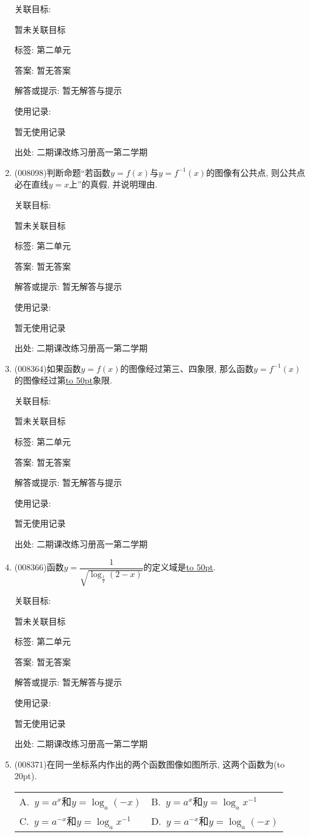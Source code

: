 \documentclass[10pt,a4paper]{article}
\newcommand{\blank}[1]{\underline{\hbox to #1pt{}}}
\newcommand{\bracket}[1]{(\hbox to #1pt{})}
\newcommand{\twoch}[4]{\par\begin{tabular}{p{.46\textwidth}p{.46\textwidth}}
A.~#1& B.~#2\\
C.~#3& D.~#4
\end{tabular}}
\begin{document}
\begin{enumerate}[1.]
关联目标:

暂未关联目标



标签: 第二单元

答案: 暂无答案

解答或提示: 暂无解答与提示

使用记录:

暂无使用记录


出处: 二期课改练习册高一第二学期
\item { (008098)}判断命题``若函数$y=f(x)$与$y=f^{-1}(x)$的图像有公共点, 则公共点必在直线$y=x$上''的真假, 并说明理由.


关联目标:

暂未关联目标



标签: 第二单元

答案: 暂无答案

解答或提示: 暂无解答与提示

使用记录:

暂无使用记录


出处: 二期课改练习册高一第二学期
\item { (008364)}如果函数$y=f(x)$的图像经过第三、四象限, 那么函数$y=f^{-1}(x)$的图像经过第\blank{50}象限.


关联目标:

暂未关联目标



标签: 第二单元

答案: 暂无答案

解答或提示: 暂无解答与提示

使用记录:

暂无使用记录


出处: 二期课改练习册高一第二学期
\item { (008366)}函数$y=\dfrac 1{\sqrt {\log _{\frac 12}(2-x)}}$的定义域是\blank{50}.


关联目标:

暂未关联目标



标签: 第二单元

答案: 暂无答案

解答或提示: 暂无解答与提示

使用记录:

暂无使用记录


出处: 二期课改练习册高一第二学期
\item { (008371)}在同一坐标系内作出的两个函数图像如图所示, 这两个函数为\bracket{20}.
\begin{center}
\end{center}
\twoch{$y=a^x$和$y=\log _a(-x)$}{$y=a^x$和$y=\log _ax^{-1}$}{$y=a^{-x}$和$y=\log _ax^{-1}$}{$y=a^{-x}$和$y=\log _a(-x)$}



\end{enumerate}
\end{document}
